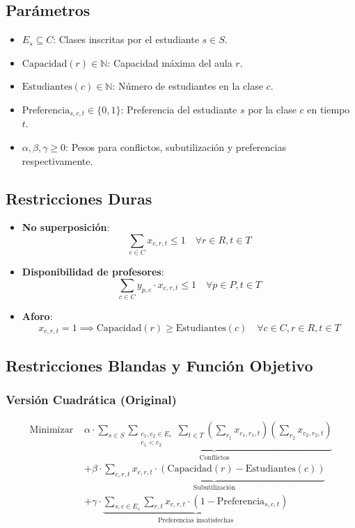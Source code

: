 \documentclass[12pt, a4paper]{article}
\begin{document}
\subsection{Parámetros}
\begin{itemize}
    \item \( E_s \subseteq C \): Clases inscritas por el estudiante \( s \in S \).
    \item \( \text{Capacidad}(r) \in \mathbb{N} \): Capacidad máxima del aula \( r \).
    \item \( \text{Estudiantes}(c) \in \mathbb{N} \): Número de estudiantes en la clase \( c \).
    \item \( \text{Preferencia}_{s,c,t} \in \{0, 1\} \): Preferencia del estudiante \( s \) por la clase \( c \) en tiempo \( t \).
    \item \( \alpha, \beta, \gamma \geq 0 \): Pesos para conflictos, subutilización y preferencias respectivamente.
\end{itemize}


\subsection{Restricciones Duras}
\begin{itemize}
    \item \textbf{No superposición}: 
        \[
        \sum_{c \in C} x_{c, r, t} \leq 1 \quad \forall r \in R, t \in T
        \]
    \item \textbf{Disponibilidad de profesores}:
        \[
        \sum_{c \in C} y_{p, c} \cdot x_{c, r, t} \leq 1 \quad \forall p \in P, t \in T
        \]
    \item \textbf{Aforo}:
        \[
        x_{c, r, t} = 1 \implies \text{Capacidad}(r) \geq \text{Estudiantes}(c) \quad \forall c \in C, r \in R, t \in T
        \]
\end{itemize}

\subsection{Restricciones Blandas y Función Objetivo}
\subsubsection{Versión Cuadrática (Original)}
\[
\begin{aligned}
\text{Minimizar } & \alpha \cdot \underbrace{\sum_{s \in S} \sum_{\substack{c_1, c_2 \in E_s \\ c_1 < c_2}} \sum_{t \in T} \left(\sum_{r_1} x_{c_1, r_1, t}\right)\left(\sum_{r_2} x_{c_2, r_2, t}\right)}_{\text{Conflictos}} \\
& + \beta \cdot \underbrace{\sum_{c, r, t} x_{c, r, t} \cdot \left(\text{Capacidad}(r) - \text{Estudiantes}(c)\right)}_{\text{Subutilización}} \\
& + \gamma \cdot \underbrace{\sum_{s, c \in E_s} \sum_{r, t} x_{c, r, t} \cdot \left(1 - \text{Preferencia}_{s,c,t}\right)}_{\text{Preferencias insatisfechas}}
\end{aligned}
\]
\end{document}
